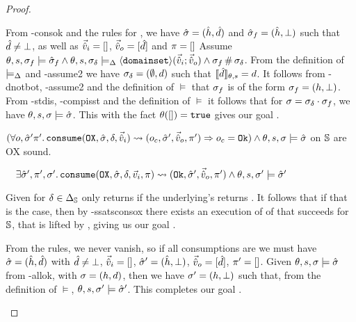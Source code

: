 \begin{proof}
\begin{hypvlist}
 From \hyp{consok} and the rules for \consume{}, we have $\hat{\sigma}=(\hat{h},\hat{d})$ and $\hat{\sigma}_f=(\hat{h},\bot)$ such that $\hat{d}\neq\bot$, as well as $\vec{\hat{v}}_i=[]$, $\vec{\hat{v}}_o=[\hat{d}]$ and $\pi=[]$
 Assume $\theta,s,\sigma_f\models \hat{\sigma}_f \land \theta, s, \sigma_\delta \models_{\Delta} \left<\texttt{domainset}\right>\!(\vec{\hat{v}}_i;\vec{\hat{v}}_o) \land \sigma_f\operatorname{\#}\sigma_\delta$.
 From the definition of $\models_{\Delta}$ and \hyp{assume2} we have $\sigma_\delta=(\emptyset, d)$ such that $\llbracket\hat{d}\rrbracket_{\theta,s}=d$.
 It follows from \hyp{dnotbot}, \hyp{assume2} and the definition of $\models$ that $\sigma_f$ is of the form $\sigma_f=(h, \bot)$.
 From \hyp{stdis}, \hyp{compisst} and the definition of $\models$ it follows that for $\sigma=\sigma_\delta\cdot\sigma_f$, we have $\theta,s,\sigma\models\hat{\sigma}$. This with the fact $\theta([])=\texttt{true}$ gives our goal .
\end{hypvlist}


\pfassume \begin{hypvlist}
 $(\forall o, \hat{\sigma}'\pi'\ldotp \texttt{consume}(\texttt{OX},\hat{\sigma},\delta,\vec{\hat{v}}_i)\rightsquigarrow (o_c, \hat{\sigma}', \vec{\hat{v}}_o, \pi')\Rightarrow o_c = \texttt{Ok})\land \theta, s, \sigma \models \hat{\sigma}$
 \consume{} on $\mathbb S$ are OX sound.
\end{hypvlist}
\pfprove \begin{goalvlist}
 $\quad \exists  \hat{\sigma}', \pi', \sigma'\ldotp \texttt{consume}(\texttt{OX}, \hat{\sigma}, \delta,\vec{v}_i,\pi)\rightsquigarrow (\texttt{Ok}, \hat{\sigma}', \vec{\hat{v}}_o, \pi') \land \theta,s,\sigma' \models \hat{\sigma}'$
\end{goalvlist}

\pfcase{$\delta \in \preds_\mmdl$}

Given \consume{} for $\delta\in\preds_\mmdl$ only returns \Ok{} if the underlying's \consume{} returns \Ok. It follows that if that is the case, then by \hyp{ssatsconsox} there exists an execution of of \consume{} that succeeds for $\mathbb S$, that is lifted by \PMap, giving us our goal .

\pfcase{$\delta = \domainset$}

\begin{hypvlist}
 From the \consume{} rules, we never vanish, so if all consumptions are \Ok{} we must have $\hat{\sigma}=(\hat{h},\hat{d})$ with $\hat{d}\neq\bot$, $\vec{\hat{v}}_i=[]$, $\hat{\sigma}'=(\hat{h},\bot)$, $\vec{\hat{v}}_o=[\hat{d}]$, $\pi'=[]$.
 Given $\theta,s,\sigma\models\hat{\sigma}$ from \hyp{allok}, with $\sigma=(h,d)$, then we have $\sigma'=(h,\bot)$ such that, from the definition of $\models$, $\theta,s,\sigma'\models\hat{\sigma}'$. This completes our goal .
\end{hypvlist}


\end{proof}
